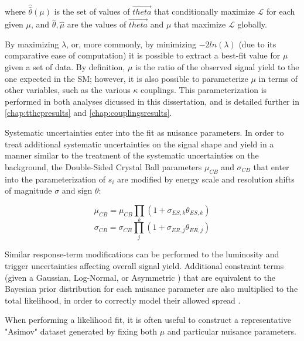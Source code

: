 where $\hat{\hat{\theta}}(\mu)$ is the set of values of $\vec{theta}$ that conditionally maximize $\mathcal{L}$ for each given $\mu$, and $\hat{\theta}, \hat{\mu}$ are the values of $\vec{theta}$ and $\mu$ that maximize $\mathcal{L}$ globally.

By maximizing $\lambda$, or, more commonly, by minimizing $-2ln(\lambda)$ (due to its comparative ease of computation) it is possible to extract a best-fit value for $\mu$ given a set of data. By definition, $\mu$ is the ratio of the observed signal yield to the one expected in the SM; however, it is also possible to parameterize $\mu$ in terms of other variables, such as the various $\kappa$ couplings. This parameterization is performed in both analyses dicussed in this dissertation, and is detailed further in \ref{chap:tthcpresults} and \ref{chap:couplingsresults}.

Systematic uncertainties enter into the fit as nuisance parameters. In order to treat additional systematic uncertainties on the signal shape and yield in a manner similar to the treatment of the systematic uncertainties on the background, the Double-Sided Crystal Ball parameters $\mu_{CB}$ and $\sigma_{CB}$ that enter into the parameterization of $s_{i}$ are modified by energy scale and resolution shifts of magnitude $\sigma$ and sign $\theta$:

\begin{equation}
\mu_{CB} = \mu_{CB} \prod_{k} (1+\sigma_{ES,k}\theta_{ES,k}) 
\end{equation}
\begin{equation}
\sigma_{CB} = \sigma_{CB} \prod_{j} (1+\sigma_{ER,j}\theta_{ER,j}) 
\end{equation}

Similar response-term modifications can be performed to the luminosity and trigger uncertainties affecting overall signal yield. Additional constraint terms (given a Gaussian, Log-Normal, or Asymmetric \cite{Cranmer}) that are equivalent to the Bayesian prior distribution for each nuisance parameter are also multiplied to the total likelihood, in order to correctly model their allowed spread \cite{JSConway}.

When performing a likelihood fit, it is often useful to construct a representative "Asimov" dataset generated by fixing both $\mu$ and particular nuisance parameters.

